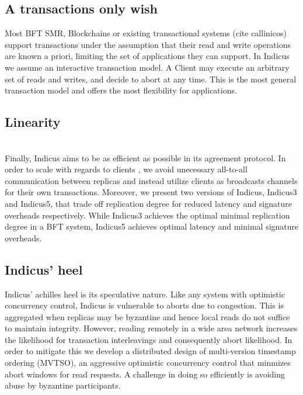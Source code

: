 \subsection{A transactions only wish}
Most BFT SMR, Blockchains or existing transactional systems (cite callinicos) support transactions under the assumption that their read and write operations are known a priori, limiting the set of applications they can support. In Indicus we assume an interactive transaction model. A Client may execute an arbitrary set of reads and writes, and decide to abort at any time. This is the most general transaction model and offers the most flexibility for applications.



\subsection{Linearity}
\\
Finally, Indicus aims to be as efficient as possible in its agreement protocol. In order to scale with regards to clients , we avoid unecessary all-to-all communication between replicas and instead utilize clients as broadcasts channels for their own transactions. Moreover, we present two versions of Indicus, Indicus3 and Indicus5, that trade off replication degree for reduced latency and signature overheads respectively. While Indicus3 achieves the optimal minimal replication degree in a BFT system, Indicus5 achieves optimal latency and minimal signature overheads.


\subsection{Indicus' heel}
Indicus' achilles heel is its speculative nature. Like any system with optimistic concurrency control, Indicus is vulnerable to aborts due to congestion. This is aggregated when replicas may be byzantine and hence local reads do not suffice to maintain integrity. However, reading remotely in a wide area network increases the likelihood for transaction interleavings and consequently abort likelihood. In order to mitigate this we develop a distributed design of multi-version timestamp ordering (MVTSO), an aggressive optimistic concurrency control that minmizes abort windows for read requests. A challenge in doing so efficiently is avoiding abuse by byzantine participants. 

